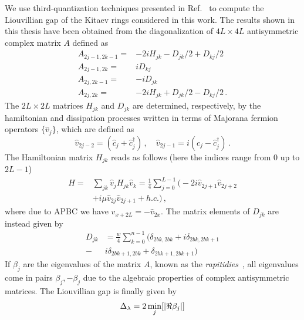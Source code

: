 We use third-quantization techniques presented in Ref.~\cite{P-2008-thirdquantization} to compute the Liouvillian gap of the Kitaev rings considered in this work. The results shown in this thesis have been obtained from the diagonalization of $4L \times 4L$ antisymmetric complex matrix $A$ defined as
\begin{equation}
\begin{aligned}
    A_{2j-1, 2k-1}=&-2iH_{jk}-D_{jk}/2+D_{kj}/2\\
    A_{2j-1, 2k}=&iD_{kj}\\
    A_{2j, 2k-1}=&-iD_{jk}\\
    A_{2j, 2k}=&-2iH_{jk}+D_{jk}/2-D_{kj}/2\,.
    \label{eq_def_A_matrix_appendix}
\end{aligned}
\end{equation}
The $2L \times 2L$ matrices $H_{jk}$ and $D_{jk}$ are determined, respectively, by the hamiltonian and dissipation processes written in terms of Majorana fermion operators $\{\hat{v}_j\}$, which are defined as
\begin{equation}
    \hat{v}_{2j-2}=(\hat{c}_j + \hat{c}^\dagger_j)\,,\quad \hat{v}_{2j-1}=i(\hat{c}_j-\hat{c}^\dagger_j)\,.
\end{equation}
The Hamiltonian matrix $H_{jk}$ reads as follows (here the indices range from $0$ up to $2L-1$)
\begin{equation}
\begin{aligned}
\hat{H}=&\sum_{jk}\hat{v}_jH_{jk}\hat{v}_k=\frac{1}{4}\sum_{j=0}^{L-1}\big(-2i\hat{v}_{2j+1}\hat{v}_{2j+2}
\\
&+i\mu\hat{v}_{2j}\hat{v}_{2j+1}+h.c.\big)\,,
\end{aligned}
\label{eq_hamiltonian_third_quantization_coordinate}
\end{equation}
where due to APBC we have $\hat{v}_{x+2L}=-\hat{v}_{2x}$. The matrix elements of $D_{jk}$ are instead given by
\begin{equation}
\begin{aligned}
   D_{jk} &= \frac{w}{4}\sum_{k=0}^{n-1}\big(\delta_{2bk,2bk}+i\delta_{2bk, 2bk+1}\\-&i\delta_{2bk+1,2bk}+\delta_{2bk+1,2bk+1}\big)
\end{aligned}
\label{eq_dissipation_third_quantization_coordinate}
\end{equation}
If $\beta_j$ are the eigenvalues of the matrix $A$, known as the \textit{rapitidies}~\cite{P-2008-thirdquantization}, all eigenvalues come in pairs $\beta_j, -\beta_j$ due to the algebraic properties of complex antisymmetric matrices. The Liouvillian gap is finally given by
\begin{equation}
    \Delta_\lambda=2\min_j[\lvert\Re \beta_j\rvert]
\end{equation}

